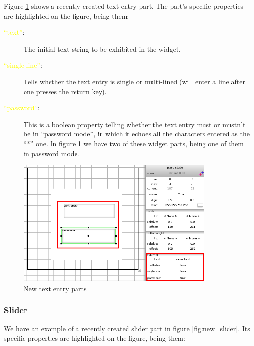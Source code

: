 \documentclass[a4paper]{profusion}
\newcommand{\GUIEditable}[1]{\textcolor{yellow}{#1}} %
\begin{document}
Figure \ref{fig:new_entry} shows a recently created text entry
part. The part's specific properties are highlighted on the figure,
being them:

\begin{description}
  \item[\GUIEditable{``text''}:] The initial text string to be
    exhibited in the widget.
  \item[\GUIEditable{``single line''}:] Tells whether the text entry
    is single or multi-lined (will enter a line after one presses the
    return key).
  \item[\GUIEditable{``password''}:] This is a boolean property
    telling whether the text entry must or mustn't be in ``password
    mode'', in which it echoes all the characters entered as the ``*''
    one. In figure \ref{fig:new_entry} we have two of these widget
    parts, being one of them in password mode.
\end{description}

\begin{figure}[h!]
  \centering
  \includegraphics[width=0.87\textwidth]{images/new_entry.png}
  \caption{New text entry parts}
  \label{fig:new_entry}
\end{figure}

\subsubsection{Slider}

We have an example of a recently created slider part in figure
\ref{fig:new_slider}. Its specific properties are highlighted on the
figure, being them:
\end{document}
